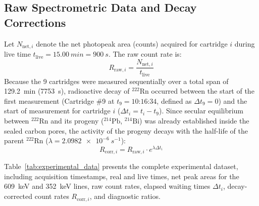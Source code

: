 \documentclass[11pt,a4paper]{article}
\begin{document}
\subsection{Raw Spectrometric Data and Decay Corrections}
Let $N_{\text{net}, i}$ denote the net photopeak area (counts) acquired for cartridge $i$ during live time $t_{\text{live}} = \SI{15.00}{min} = \SI{900}{s}$. The raw count rate is:
\begin{equation}
    R_{\text{raw}, i} = \frac{N_{\text{net}, i}}{t_{\text{live}}}
\end{equation}
Because the 9 cartridges were measured sequentially over a total span of \SI{129.2}{min} (\SI{7753}{s}), radioactive decay of $^{222}\text{Rn}$ occurred between the start of the first measurement (Cartridge \#9 at $t_9 = \text{10:16:34}$, defined as $\Delta t_9 = 0$) and the start of measurement for cartridge $i$ ($\Delta t_i = t_i - t_9$). Since secular equilibrium between $^{222}\text{Rn}$ and its progeny ($^{214}\text{Pb}$, $^{214}\text{Bi}$) was already established inside the sealed carbon pores, the activity of the progeny decays with the half-life of the parent $^{222}\text{Rn}$ ($\lambda = \SI{2.0982e-6}{s^{-1}}$):
\begin{equation}
    R_{\text{corr}, i} = R_{\text{raw}, i} \cdot e^{\lambda \Delta t_i}
    \label{eq:decay_corr}
\end{equation}

Table~\ref{tab:experimental_data} presents the complete experimental dataset, including acquisition timestamps, real and live times, net peak areas for the \SI{609}{keV} and \SI{352}{keV} lines, raw count rates, elapsed waiting times $\Delta t_i$, decay-corrected count rates $R_{\text{corr}, i}$, and diagnostic ratios.
\end{document}
